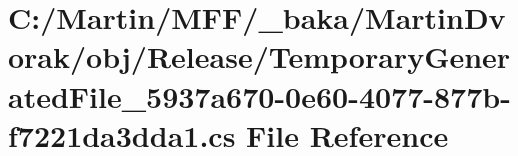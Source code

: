 \hypertarget{_martin_dvorak_2obj_2_release_2_temporary_generated_file__5937a670-0e60-4077-877b-f7221da3dda1_8cs}{}\section{C\+:/\+Martin/\+M\+F\+F/\+\_\+baka/\+Martin\+Dvorak/obj/\+Release/\+Temporary\+Generated\+File\+\_\+5937a670-\/0e60-\/4077-\/877b-\/f7221da3dda1.cs File Reference}
\label{_martin_dvorak_2obj_2_release_2_temporary_generated_file__5937a670-0e60-4077-877b-f7221da3dda1_8cs}
